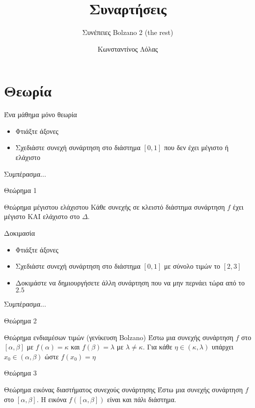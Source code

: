 \documentclass[greek]{beamer}
\title{Συναρτήσεις}
\subtitle{Συνέπειες Bolzano 2 (the rest)}
\author[Λόλας]{Κωνσταντίνος Λόλας}
\date{}
\begin{document}
\begin{frame}
 \titlepage
\end{frame}

\section{Θεωρία}
\begin{frame}{Ένα μάθημα μόνο θεωρία}
 \begin{itemize}
  \item<1-> Φτιάξτε άξονες
  \item<2-> Σχεδιάστε συνεχή συνάρτηση στο διάστημα $[0,1]$ που δεν έχει μέγιστο ή ελάχιστο
 \end{itemize}
 Συμπέρασμα...
\end{frame}

\begin{frame}{Θεώρημα 1}
 \begin{block}{Θεώρημα μέγιστου ελάχιστου}
  Κάθε συνεχής σε κλειστό διάστημα συνάρτηση $f$ έχει μέγιστο ΚΑΙ ελάχιστο στο $Δ$.
 \end{block}
\end{frame}

\begin{frame}{Δοκιμασία}
 \begin{itemize}
  \item<1-> Φτιάξτε άξονες
  \item<2-> Σχεδιάστε συνεχή συνάρτηση στο διάστημα $[0,1]$ με σύνολο τιμών το $[2,3]$
  \item<3-> Δοκιμάστε να δημιουργήσετε άλλη συνάρτηση που να μην περνάει τώρα από το $2.5$
 \end{itemize}
 Συμπέρασμα...
\end{frame}

\begin{frame}{Θεώρημα 2}
 \begin{block}{Θεώρημα ενδιαμέσων τιμών (γενίκευση Bolzano)}
  Έστω μια συνεχής συνάρτηση $f$ στο $[α,β]$ με $f(α)=κ$ και $f(β)=λ$ με $λ\ne κ$. Για κάθε $η\in (κ,λ)$ υπάρχει $x_0\in (α,β)$ ώστε $f(x_0)=η$
 \end{block}
\end{frame}

\begin{frame}{Θεώρημα 3}
 \begin{block}{Θεώρημα εικόνας διαστήματος συνεχούς συνάρτησης}
  Έστω μια συνεχής συνάρτηση $f$ στο $[α,β]$. Η εικόνα $f([α,β])$ είναι και πάλι διάστημα.
 \end{block}
\end{frame}
\end{document}
